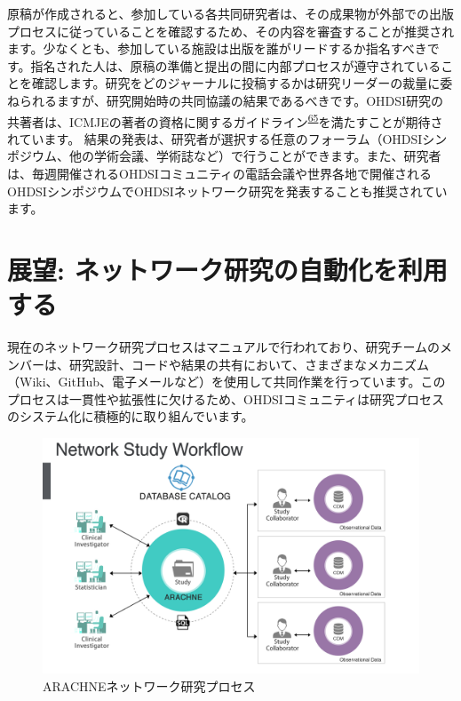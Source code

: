\documentclass[
  11pt]{book}
\theoremstyle{definition}
\theoremstyle{definition}
\theoremstyle{definition}
\theoremstyle{definition}
\theoremstyle{remark}
\begin{document}
原稿が作成されると、参加している各共同研究者は、その成果物が外部での出版プロセスに従っていることを確認するため、その内容を審査することが推奨されます。少なくとも、参加している施設は出版を誰がリードするか指名すべきです。指名された人は、原稿の準備と提出の間に内部プロセスが遵守されていることを確認します。研究をどのジャーナルに投稿するかは研究リーダーの裁量に委ねられるますが、研究開始時の共同協議の結果であるべきです。OHDSI研究の共著者は、ICMJEの著者の資格に関するガイドライン\textsuperscript{\href{https://ohdsi.github.io/TheBookOfOhdsi/NetworkResearch.html\#fn65}{65}}を満たすことが期待されています。 結果の発表は、研究者が選択する任意のフォーラム（OHDSIシンポジウム、他の学術会議、学術誌など）で行うことができます。また、研究者は、毎週開催されるOHDSIコミュニティの電話会議や世界各地で開催されるOHDSIシンポジウムでOHDSIネットワーク研究を発表することも推奨されています。

\section{展望: ネットワーク研究の自動化を利用する}\label{ux5c55ux671b-ux30cdux30c3ux30c8ux30efux30fcux30afux7814ux7a76ux306eux81eaux52d5ux5316ux3092ux5229ux7528ux3059ux308b}


現在のネットワーク研究プロセスはマニュアルで行われており、研究チームのメンバーは、研究設計、コードや結果の共有において、さまざまなメカニズム（Wiki、GitHub、電子メールなど）を使用して共同作業を行っています。このプロセスは一貫性や拡張性に欠けるため、OHDSIコミュニティは研究プロセスのシステム化に積極的に取り組んでいます。

\begin{figure}[h]

{\centering \includegraphics[width=0.9\linewidth]{images/NetworkStudies/ARACHNE} 

}

\caption{ARACHNEネットワーク研究プロセス}\label{fig:arachne}
\end{figure}
\end{document}
